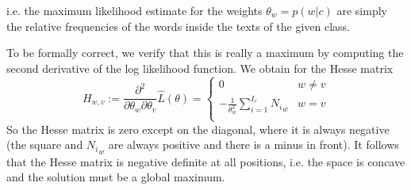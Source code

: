 \documentclass[%
   11pt,              %
   ngerman,           %
   a4paper,           %
   DIV11,             %
]{scrartcl}%
\begin{document}
i.e. the maximum likelihood estimate for the weights $\theta_w = p(w|c)$ are simply the relative frequencies of the words inside the texts of the given class. \par
To be formally correct, we verify that this is really a maximum by computing the second derivative of the log likelihood function. We obtain for the Hesse matrix
\begin{equation*}
	H_{w,v} := \frac{\partial^2}{\partial \theta_w \partial \theta_v} \hat{L}(\theta) = \begin{cases}
	0 & w \neq v \\
	- \frac{1}{\theta_w^2} \sum_{i=1}^{I_c} {N_i}_w & w = v \\ \end{cases}
\end{equation*}
So the Hesse matrix is zero except on the diagonal, where it is always negative (the square and ${N_i}_w$ are always positive and there is a minus in front). It follows that the Hesse matrix is negative definite at all positions, i.e. the space is concave and the solution must be a global maximum.
\end{document}
